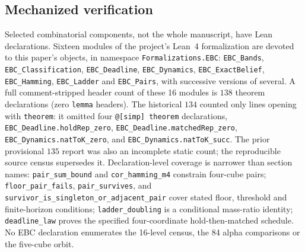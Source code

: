 \documentclass[10pt,twocolumn]{article}
\theoremstyle{plain}
\theoremstyle{definition}
\theoremstyle{remark}
\begin{document}
\subsection{Mechanized verification}
\label{scale-mech}

Selected combinatorial components, not the whole manuscript, have
Lean declarations. Sixteen modules of the project's
Lean~4 formalization are devoted to this paper's objects, in namespace
\texttt{Formalizations.EBC}: \texttt{EBC\_Bands}, \texttt{EBC\_Classification},
\texttt{EBC\_Deadline}, \texttt{EBC\_Dynamics}, \texttt{EBC\_ExactBelief},
\texttt{EBC\_Hamming}, \texttt{EBC\_Ladder} and \texttt{EBC\_Pairs}, with successive
versions of several. A full comment-stripped header count of these 16 modules is
\(138\) theorem declarations (zero \texttt{lemma} headers). The
historical \(134\) counted only lines opening with \texttt{theorem}:
it omitted four \texttt{@[simp] theorem} declarations,
\texttt{EBC\_Deadline.holdRep\_zero},
\texttt{EBC\_Deadline.matchedRep\_zero},
\texttt{EBC\_Dynamics.natToK\_zero}, and
\texttt{EBC\_Dynamics.natToK\_succ}. The prior provisional
\(135\) report was also an incomplete static count; the
reproducible source census supersedes it. Declaration-level coverage
is narrower than section names: \texttt{pair\_sum\_bound} and
\texttt{cor\_hamming\_m4} constrain four-cube pairs;
\texttt{floor\_pair\_fails}, \texttt{pair\_survives}, and
\texttt{survivor\_is\_singleton\_or\_adjacent\_pair}
cover stated floor, threshold and finite-horizon conditions;
\texttt{ladder\_doubling} is a conditional mass-ratio identity;
\texttt{deadline\_law} proves the specified four-coordinate
hold-then-matched schedule. No EBC declaration enumerates the
16-level census, the 84 alpha comparisons or the five-cube orbit.
\end{document}
